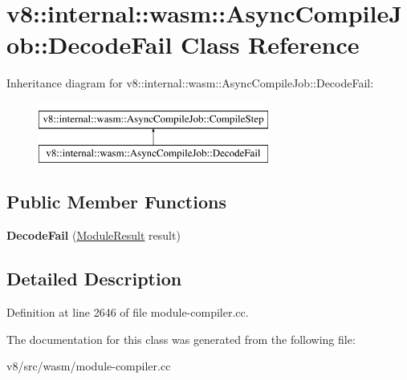 \hypertarget{classv8_1_1internal_1_1wasm_1_1AsyncCompileJob_1_1DecodeFail}{}\section{v8\+:\+:internal\+:\+:wasm\+:\+:Async\+Compile\+Job\+:\+:Decode\+Fail Class Reference}
\label{classv8_1_1internal_1_1wasm_1_1AsyncCompileJob_1_1DecodeFail}
Inheritance diagram for v8\+:\+:internal\+:\+:wasm\+:\+:Async\+Compile\+Job\+:\+:Decode\+Fail\+:\begin{figure}[H]
\begin{center}
\leavevmode
\includegraphics[height=2.000000cm]{classv8_1_1internal_1_1wasm_1_1AsyncCompileJob_1_1DecodeFail}
\end{center}
\end{figure}
\subsection*{Public Member Functions}
\begin{DoxyCompactItemize}
\item 
\mbox{\label{classv8_1_1internal_1_1wasm_1_1AsyncCompileJob_1_1DecodeFail_afd90e736fe4474dd4c5297acb6bf0310}} 
{\bfseries Decode\+Fail} (\mbox{\hyperlink{classv8_1_1internal_1_1wasm_1_1Result}{Module\+Result}} result)
\end{DoxyCompactItemize}


\subsection{Detailed Description}


Definition at line 2646 of file module-\/compiler.\+cc.



The documentation for this class was generated from the following file\+:\begin{DoxyCompactItemize}
\item 
v8/src/wasm/module-\/compiler.\+cc\end{DoxyCompactItemize}
